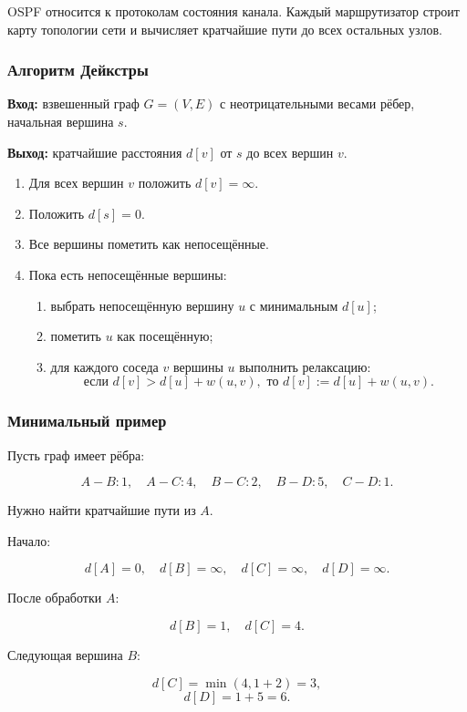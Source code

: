 \documentclass[12pt,a4paper]{article}
\begin{document}
OSPF относится к протоколам состояния канала. Каждый маршрутизатор строит карту топологии сети и вычисляет кратчайшие пути до всех остальных узлов.

\subsubsection{Алгоритм Дейкстры}

\textbf{Вход:} взвешенный граф $G=(V,E)$ с неотрицательными весами рёбер, начальная вершина $s$.

\textbf{Выход:} кратчайшие расстояния $d[v]$ от $s$ до всех вершин $v$.

\begin{enumerate}
    \item Для всех вершин $v$ положить $d[v] = \infty$.
    \item Положить $d[s] = 0$.
    \item Все вершины пометить как непосещённые.
    \item Пока есть непосещённые вершины:
    \begin{enumerate}
        \item выбрать непосещённую вершину $u$ с минимальным $d[u]$;
        \item пометить $u$ как посещённую;
        \item для каждого соседа $v$ вершины $u$ выполнить релаксацию:
        \[
        \text{если } d[v] > d[u] + w(u,v),
        \text{ то } d[v] := d[u] + w(u,v).
        \]
    \end{enumerate}
\end{enumerate}

\subsubsection{Минимальный пример}

Пусть граф имеет рёбра:

\[
A-B:1,\quad A-C:4,\quad B-C:2,\quad B-D:5,\quad C-D:1.
\]

Нужно найти кратчайшие пути из $A$.

Начало:

\[
d[A]=0,\quad d[B]=\infty,\quad d[C]=\infty,\quad d[D]=\infty.
\]

После обработки $A$:

\[
d[B]=1,\quad d[C]=4.
\]

Следующая вершина $B$:

\[
d[C]=\min(4,1+2)=3,
\]
\[
d[D]=1+5=6.
\]
\end{document}
